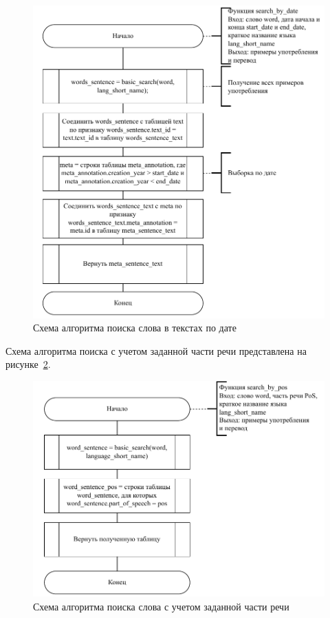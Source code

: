 \begin{figure}[ht]
	\centering
	\includegraphics[width=\textwidth]{img/search-algo-date.pdf}
	\caption{Схема алгоритма поиска слова в текстах по дате}
	\label{date-search}
\end{figure}
\clearpage
Схема алгоритма поиска с учетом заданной части речи представлена на рисунке~\ref{pos-search}.

\begin{figure}[ht]
	\centering
	\includegraphics[width=\textwidth]{img/search-algo-pos.pdf}
	\caption{Схема алгоритма поиска слова с учетом заданной части речи}
	\label{pos-search}
\end{figure}

